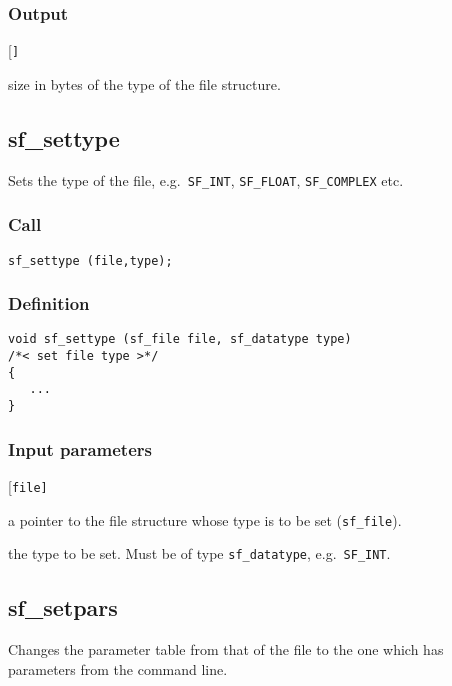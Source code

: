 \subsubsection*{Output}
\begin{desclist}{\tt }{\quad}[\tt ]
   \setlength\itemsep{0pt}
   \item[size] size in bytes of the type of the file structure.
\end{desclist}




\subsection{{sf\_settype}}
Sets the type of the file, e.g.~\texttt{SF\_INT}, \texttt{SF\_FLOAT}, \texttt{SF\_COMPLEX} etc.

\subsubsection*{Call}
\begin{verbatim}sf_settype (file,type);\end{verbatim}

\subsubsection*{Definition}
\begin{verbatim}
void sf_settype (sf_file file, sf_datatype type)
/*< set file type >*/
{
   ...
}
\end{verbatim}

\subsubsection*{Input parameters}
\begin{desclist}{\tt }{\quad}[\tt file]
   \setlength\itemsep{0pt}
   \item[file] a pointer to the file structure whose type is to be set (\texttt{sf\_file}). 
   \item[type] the type to be set. Must be of type \texttt{sf\_datatype}, e.g.~\texttt{SF\_INT}.
\end{desclist}




\subsection{{sf\_setpars}}
Changes the parameter table from that of the file to the one which has parameters from the command line.

